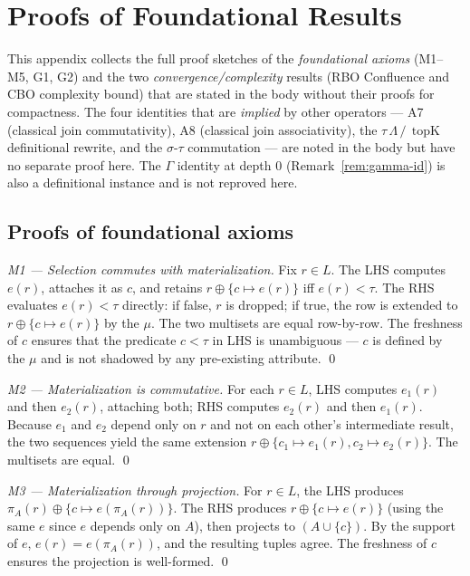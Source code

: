 \documentclass[acmsmall,review,anonymous]{acmart}
\theoremstyle{plain}
\theoremstyle{definition}
\newcommand{\topK}{\operatorname{topK}}
\theoremstyle{remark}
\begin{document}
\appendix
\section{Proofs of Foundational Results}

This appendix collects the full proof sketches of the
\emph{foundational axioms} (M1--M5, G1, G2) and the two
\emph{convergence/complexity} results (RBO Confluence and CBO
complexity bound) that are stated in the body without their
proofs for compactness. The four identities that are
\emph{implied} by other operators --- A7 (classical join
commutativity), A8 (classical join associativity), the
$\tau\,\Lambda\,/\,\topK$ definitional rewrite, and the
$\sigma$-$\tau$ commutation --- are noted in the body but have
no separate proof here. The $\Gamma$ identity at depth $0$
(Remark~\ref{rem:gamma-id}) is also a definitional instance and
is not reproved here.

\subsection{Proofs of foundational axioms}\label{app:axioms}

\begin{proof}[M1 --- Selection commutes with materialization]
Fix $r \in L$. The LHS computes $e(r)$, attaches it as $c$, and
retains $r \oplus \{c \mapsto e(r)\}$ iff $e(r) < \tau$. The RHS
evaluates $e(r) < \tau$ directly: if false, $r$ is dropped; if true,
the row is extended to $r \oplus \{c \mapsto e(r)\}$ by the $\mu$.
The two multisets are equal row-by-row. The freshness of $c$ ensures
that the predicate $c < \tau$ in LHS is unambiguous --- $c$ is defined
by the $\mu$ and is not shadowed by any pre-existing attribute.
\qed
\end{proof}

\begin{proof}[M2 --- Materialization is commutative]
For each $r \in L$, LHS computes $e_1(r)$ and then $e_2(r)$, attaching
both; RHS computes $e_2(r)$ and then $e_1(r)$. Because $e_1$ and
$e_2$ depend only on $r$ and not on each other's intermediate
result, the two sequences yield the same extension $r \oplus \{c_1
\mapsto e_1(r), c_2 \mapsto e_2(r)\}$. The multisets are equal. \qed
\end{proof}

\begin{proof}[M3 --- Materialization through projection]
For $r \in L$, the LHS produces $\pi_A(r) \oplus \{c \mapsto
e(\pi_A(r))\}$. The RHS produces $r \oplus \{c \mapsto e(r)\}$ (using
the same $e$ since $e$ depends only on $A$), then projects to
$(A \cup \{c\})$. By the support of $e$, $e(r) = e(\pi_A(r))$, and
the resulting tuples agree. The freshness of $c$ ensures the
projection is well-formed. \qed
\end{proof}
\end{document}
